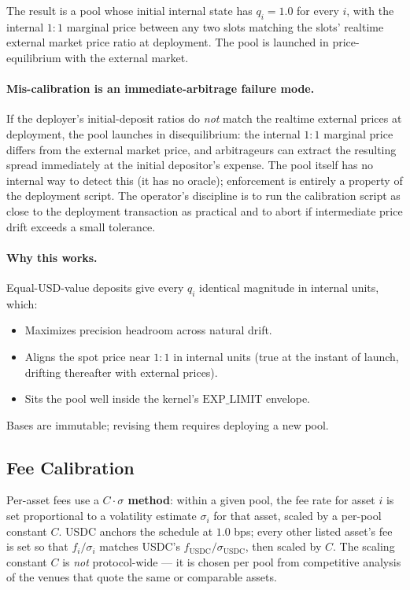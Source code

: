 \documentclass[11pt]{article}
\begin{document}
The result is a pool whose initial internal state has
$q_i = 1.0$ for every $i$, with the internal $1{:}1$ marginal price
between any two slots matching the slots' realtime external market price
ratio at deployment. The pool is launched in price-equilibrium with the
external market.

\paragraph{Mis-calibration is an immediate-arbitrage failure mode.}
If the deployer's initial-deposit ratios do \emph{not} match the realtime
external prices at deployment, the pool launches in disequilibrium: the
internal $1{:}1$ marginal price differs from the external market price,
and arbitrageurs can extract the resulting spread immediately at the
initial depositor's expense. The pool itself has no internal way to
detect this (it has no oracle); enforcement is entirely a property of
the deployment script. The operator's discipline is to run the
calibration script as close to the deployment transaction as practical
and to abort if intermediate price drift exceeds a small tolerance.

\paragraph{Why this works.}
Equal-USD-value deposits give every $q_i$ identical magnitude in internal
units, which:

\begin{itemize}
  \item Maximizes precision headroom across natural drift.
  \item Aligns the spot price near $1{:}1$ in internal units (true at the
        instant of launch, drifting thereafter with external prices).
  \item Sits the pool well inside the kernel's $\mathrm{EXP\_LIMIT}$
        envelope.
\end{itemize}

Bases are immutable; revising them requires deploying a new pool.

\subsection{Fee Calibration}
\label{sec:fee-calibration}

Per-asset fees use a \textbf{$C \cdot \sigma$ method}: within a given pool,
the fee rate for asset $i$ is set proportional to a volatility estimate
$\sigma_i$ for that asset, scaled by a per-pool constant $C$. USDC
anchors the schedule at $1.0$ bps; every other listed asset's fee is set
so that $f_i / \sigma_i$ matches USDC's $f_{\mathrm{USDC}} / \sigma_{\mathrm{USDC}}$,
then scaled by $C$. The scaling constant $C$ is \emph{not} protocol-wide
--- it is chosen per pool from competitive analysis of the venues that
quote the same or comparable assets.
\end{document}
